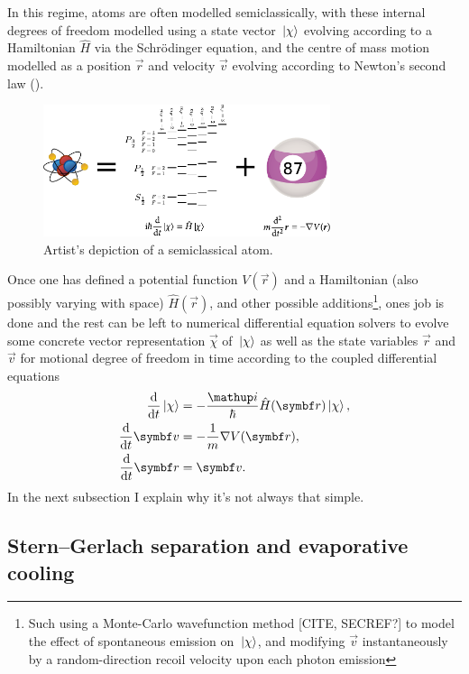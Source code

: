 In this regime, atoms are often modelled semiclassically, with these internal degrees of freedom modelled using a state vector $\ket\chi$ evolving according to a Hamiltonian $\hat H$ via the Schr\"odinger equation, and the centre of mass motion modelled as a position $\vec r$ and velocity $\vec v$ evolving according to Newton's second law ().

\begin{figure}[t]
    \centerfloat
    \includegraphics[width=0.75\textwidth]{figures/hidden_variables/semiclassical.pdf}
    \caption{Artist's depiction of a semiclassical atom.}
    \label{fig:semiclassical}
\end{figure}

Once one has defined a potential function $V(\vec r)$ and a Hamiltonian (also possibly varying with space) $\hat H(\vec r)$, and other possible additions\footnote{Such using a Monte-Carlo wavefunction method [CITE, SECREF?] to model the effect of spontaneous emission on $\ket\chi$, and modifying $\vec v$ instantaneously by a random-direction recoil velocity upon each photon emission}, ones job is done and the rest can be left to numerical differential equation solvers to evolve some concrete vector representation $\vec\chi$ of $\ket\chi$ as well as the state variables $\vec r$ and $\vec v$ for motional degree of freedom in time according to the coupled differential equations
\begin{align}\label{eq:simple_semiclassical_first}
\dv{t}\ket\chi &= -\frac\ii\hbar \hat H(\vec r)\ket\chi,\\
\dv{t}\vec v &= -\frac1m\nabla V(\vec r),\\
\dv{t}\vec r &= \vec v\label{eq:simple_semiclassical_last}.
\end{align}
In the next subsection I explain why it's not always that simple.

\subsection{Stern--Gerlach separation and evaporative cooling}

